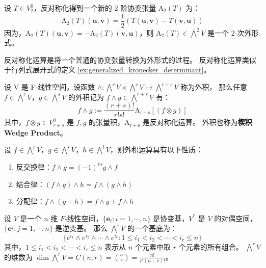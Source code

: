 \begin{example}
    设 $T\in V^0_2$，反对称化得到一个新的 2 阶协变张量 $\mathrm{A_2}(T)$ 为：
    \[
        \mathrm{A_2}(T)(\mathbf{u},\mathbf{v}) = \frac{1}{2}(T(\mathbf{u},\mathbf{v}) - T(\mathbf{v},\mathbf{u}))
    \]
    因为，$\mathrm{A_2}(T)(\mathbf{u},\mathbf{v}) = -\mathrm{A_2}(T)(\mathbf{v},\mathbf{u})$，则 $\mathrm{A_2}(T) \in \bigwedge^2 V$ 是一个 2-次外形式。
    \label{ex:2-exterior_form}
\end{example}

\begin{note}
    反对称化运算是将一个普通的协变张量转换为外形式的过程。
    反对称化运算类似于行列式展开式的定义 \ref{ex:generalized_kronecker_determinant}。
\end{note}
\vspace{1em}

\begin{definition}
    设 V 是 F-线性空间，设函数 $\wedge : \bigwedge^rV \times \bigwedge^sV \to \bigwedge^{r+s}V$ 称为外积，
    那么任意 $f\in \bigwedge^rV$，$g\in \bigwedge^sV$ 的外积记为 $f\wedge g \in \bigwedge^{r+s}V$ 有：
    \[
        f\wedge g := \frac{(r+s)!}{r!s!} \mathrm{A_{r+s}}[(f\otimes g)]
    \]
    其中，$f\otimes g \in V^0_{r+s}$ 是 $f,g$ 的张量积，$\mathrm{A_{r+s}}$ 是反对称化运算。
    外积也称为\textbf{楔积 Wedge Product}。
    \label{def:exterior_product}
\end{definition}

\begin{proposition}[外积运算的性质]
    设 $f\in \bigwedge^rV$，$g\in \bigwedge^sV$，$h\in \bigwedge^tV$，则外积运算具有以下性质：
    \begin{enumerate}
        \item 反交换律：$f\wedge g = (-1)^{rs} g\wedge f$
        \item 结合律：$(f\wedge g)\wedge h = f\wedge (g\wedge h)$
        \item 分配律：$f\wedge (g+h) = f\wedge g + f\wedge h$
    \end{enumerate}
    \label{prop:exterior_product_property}
\end{proposition}

\begin{proposition}[外形式的基底]
    设 $V$ 是一个 $n$ 维 $F$-线性空间，$\{\mathbf{e}_i:i=1,\cdots,n\}$ 是协变基，$V^*$ 是 $V$ 的对偶空间，$\{\mathbf{e}^j:j=1,\cdots,n\}$ 是逆变基。
    那么 $\bigwedge^rV$ 的一个基底为：
    \[
        \{e^{i_1}\wedge e^{i_2}\wedge \cdots \wedge e^{i_r} : 1\leq i_1 < i_2 < \cdots < i_r \leq n\}
    \]
    其中，$1\leq i_1 < i_2 < \cdots < i_r \leq n$ 表示从 $n$ 个元素中取 $r$ 个元素的所有组合。
    $\bigwedge^rV$ 的维数为 $\dim \bigwedge^rV = C(n,r)=\binom{n}{r} = \frac{n!}{r!(n-r)!}$。
\end{proposition}

